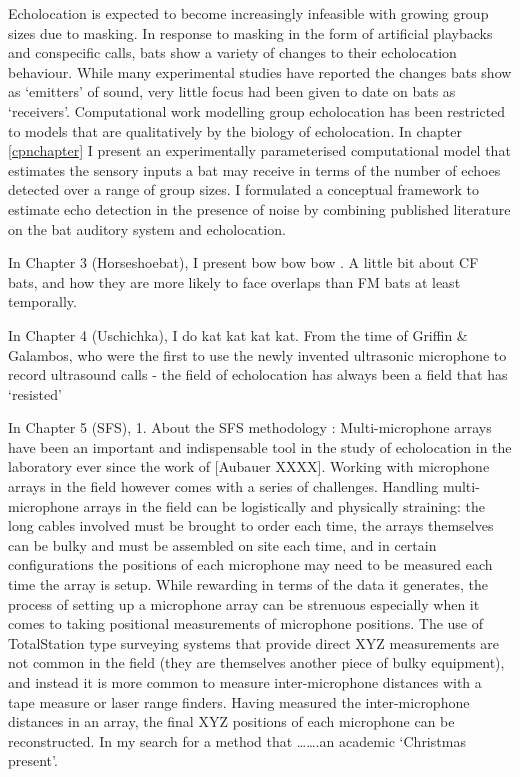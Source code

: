 \documentclass[
]{book}
\begin{document}
Echolocation is expected to become increasingly infeasible with growing group sizes due to masking. In response to masking in the form of artificial playbacks and conspecific calls, bats show a variety of changes to their echolocation behaviour. While many experimental studies have reported the changes bats show as `emitters' of sound, very little focus had been given to date on bats as `receivers'. Computational work modelling group echolocation has been restricted to models that are qualitatively by the biology of echolocation. In chapter \ref{cpnchapter} I present an experimentally parameterised computational model that estimates the sensory inputs a bat may receive in terms of the number of echoes detected over a range of group sizes. I formulated a conceptual framework to estimate echo detection in the presence of noise by combining published literature on the bat auditory system and echolocation.

In Chapter 3 (Horseshoebat), I present bow bow bow . A little bit about CF bats, and how they are more likely to face overlaps than FM bats at least temporally.

In Chapter 4 (Uschichka), I do kat kat kat kat. From the time of Griffin \& Galambos, who were the first to use the newly invented ultrasonic microphone to record ultrasound calls - the field of echolocation has always been a field that has `resisted'

In Chapter 5 (SFS),
1. About the SFS methodology : Multi-microphone arrays have been an important and indispensable tool in the study of echolocation in the laboratory ever since the work of {[}Aubauer XXXX{]}. Working with microphone arrays in the field however comes with a series of challenges. Handling multi-microphone arrays in the field can be logistically and physically straining: the long cables involved must be brought to order each time, the arrays themselves can be bulky and must be assembled on site each time, and in certain configurations the positions of each microphone may need to be measured each time the array is setup. While rewarding in terms of the data it generates, the process of setting up a microphone array can be strenuous especially when it comes to taking positional measurements of microphone positions. The use of TotalStation type surveying systems that provide direct XYZ measurements are not common in the field (they are themselves another piece of bulky equipment), and instead it is more common to measure inter-microphone distances with a tape measure or laser range finders. Having measured the inter-microphone distances in an array, the final XYZ positions of each microphone can be reconstructed. In my search for a method that \ldots\ldots.an academic `Christmas present'.
\end{document}
